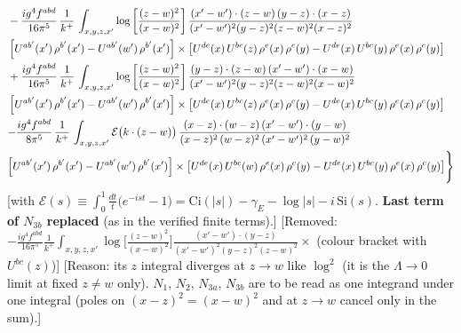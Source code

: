 \documentclass[9pt]{article}
\numberwithin{equation}{section}
\begin{document}
{\begin{align*}
& -\frac{ig^{4}f^{abd}}{16\pi^{5}}\,\frac{1}{k^{+}}\,\int_{x,y,z,x'}\log{\left[\frac{(z-w)^{2}}{(x-w)^{2}}\right]}\,
\frac{(x'-w')\cdot(z-w)\,(y-z)\cdot(x-z)}{(x'-w')^{2}(y-z)^{2}(z-w)^{2}(x-z)^{2}}\notag \\
&\left[U^{ab'}(x')\,\rho^{b'}(x')-U^{ab'}(w')\, \rho^{b'}(x')\right]\times \left[U^{de}(x)\,U^{bc}(z)\, \rho^{e}(x)\,\rho^{c}(y)-U^{de}(x)\,U^{bc}(y)\,\rho^{e}(x)\,\rho^{c}(y)\right] \notag \\
&+ \frac{ig^{4}f^{abd}}{16\pi^{5}}\,\frac{1}{k^{+}}\,\int_{x,y,z,x'}\log{\left[\frac{(z-w)^{2}}{(x-w)^{2}}\right]}\,
\frac{(y-z)\cdot(z-w)\,(x'-w')\cdot(x-w)}{(x'-w')^{2}(y-z)^{2}(z-w)^{2}(x-w)^{2}}\notag \\ 
& \left[U^{ab'}(x')\,\rho^{b'}(x')-U^{ab'}(w')\, \rho^{b'}(x')\right]\times \left[U^{de}(x)\,U^{bc}(z)\, \rho^{e}(x)\,\rho^{c}(y)-U^{de}(x)\,U^{bc}(y)\,\rho^{e}(x)\,\rho^{c}(y)\right]\notag \\ &  {-\frac{ig^{4}f^{abd}}{8\pi^{5}}\,\frac{1}{k^{+}}\,\int_{x,y,z,x'}\mathcal{E}\big(k\cdot(z-w)\big)\,\frac{(x-z)\cdot(w-z)\,(x'-w')\cdot(y-w)}{(x-z)^{2}\,(w-z)^{2}\,(x'-w')^{2}\,(y-w)^{2}}}\notag \\ & {\left[U^{ab'}(x')\,\rho^{b'}(x')-U^{ab'}(w')\, \rho^{b'}(x')\right]\times \left[U^{de}(x)\,U^{bc}(w)\, \rho^{e}(x)\,\rho^{c}(y)-U^{de}(x)\,U^{bc}(y)\,\rho^{e}(x)\,\rho^{c}(y)\right]}\Bigg\}
\end{align*} {[with $\mathcal{E}(s)\equiv\int_{0}^{1}\frac{dt}{t}\big(e^{-ist}-1\big)=\mathrm{Ci}(|s|)-\gamma_{E}-\log|s|-i\,\mathrm{Si}(s)$. \textbf{Last term of $N_{3b}$ replaced} (as in the verified finite terms).]} {[Removed: $-\frac{ig^{4}f^{abd}}{16\pi^{5}}\frac{1}{k^{+}}\int_{x,y,z,x'}\log\big[\frac{(z-w)^{2}}{(x-w)^{2}}\big]\frac{(x'-w')\cdot(y-z)}{(x'-w')^{2}(y-z)^{2}(z-w)^{2}}\times$ (colour bracket with $U^{bc}(z)$)]} {[Reason: its $z$ integral diverges at $z\to w$ like $\log^{2}$ (it is the $\Lambda\to0$ limit at fixed $z\neq w$ only). $N_{1}$, $N_{2}$, $N_{3a}$, $N_{3b}$ are to be read as one integrand under one integral (poles on $(x-z)^{2}=(x-w)^{2}$ and at $z\to w$ cancel only in the sum).]}\par\noindent
}\par
\end{document}
